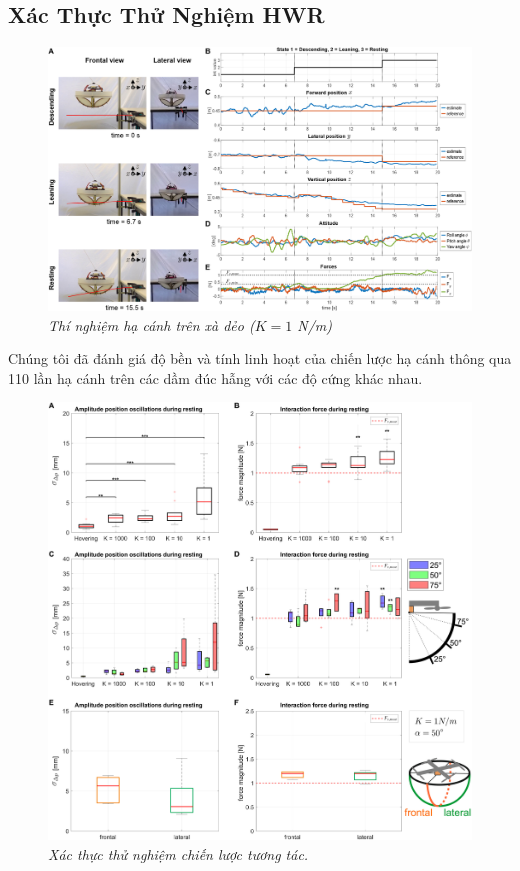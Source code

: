 \documentclass[12pt,a4paper]{article}
\begin{document}
\subsection{Xác Thực Thử Nghiệm HWR}
\begin{figure}[ht!]
    \centering
    \includegraphics[scale = 0.9]{hinh 4}
    \caption{\textit{Thí nghiệm hạ cánh trên xà dẻo ($K = 1$  N/m)}}
    \label{fig4}
\end{figure}
Chúng tôi đã đánh giá độ bền và tính linh hoạt của chiến lược hạ cánh thông qua 110 lần hạ cánh trên các dầm đúc hẫng với các độ cứng khác nhau.
\newpage
\begin{figure}[ht!]
    \centering
    \includegraphics[scale = 0.6]{hinh 5}
    \caption{\textit{Xác thực thử nghiệm chiến lược tương tác.}}
    \label{fig5}
\end{figure}
\end{document}
